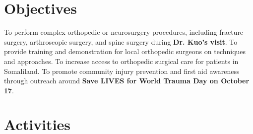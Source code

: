 \documentclass{article}
\begin{document}
\section{Objectives}
\begin{outline}
\1 To perform complex orthopedic or neurosurgery procedures, including fracture surgery, arthroscopic surgery, and spine surgery during \textbf{Dr. Kuo's visit}.
\1 To provide training and demonstration for local orthopedic surgeons on techniques and approaches.
\1 To increase access to orthopedic surgical care for patients in Somaliland.
\1 To promote community injury prevention and first aid awareness through outreach around \textbf{Save LIVES for World Trauma Day on October 17}.


\end{outline}


\section{Activities}
\end{document}
